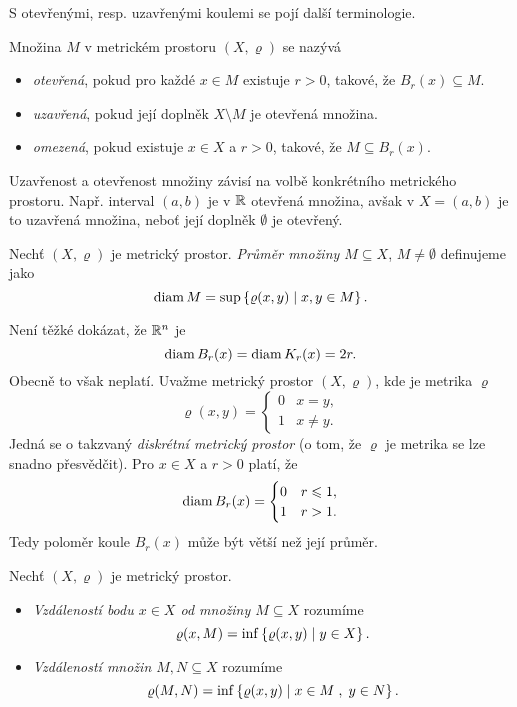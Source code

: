 S otevřenými, resp. uzavřenými koulemi se pojí další terminologie.
\begin{definition}\label{def:otevrena-uzavrena-omezena-mnozina}
     Množina $M$ v metrickém prostoru $(X,\varrho)$ se nazývá
     \begin{itemize}
        \item \emph{otevřená}, pokud pro každé $x\in M$ existuje $r>0$, takové, že $B_r(x)\subseteq M$.
        \item \emph{uzavřená}, pokud její doplněk $X\setminus M$ je otevřená množina.
        \item \emph{omezená}, pokud existuje $x\in X$ a $r>0$, takové, že $M\subseteq B_r(x)$.
     \end{itemize}
\end{definition}
Uzavřenost a otevřenost množiny závisí na volbě konkrétního metrického prostoru. Např. interval $(a,b)$ je v $\mathbb{R}$ otevřená množina, avšak v $X=(a,b)$ je to uzavřená množina, neboť její doplněk $\emptyset$ je otevřený.
\begin{definition}\label{def:prumer-mnoziny}
    Nechť $(X,\varrho)$ je metrický prostor. \emph{Průměr množiny $M\subseteq X$}, $M\neq\emptyset$ definujeme jako
    \[\operatorname{diam}{M}=\sup\left\{\varrho(x,y)\mid x,y\in M\right\}.\]
\end{definition}
Není těžké dokázat, že $\mathbb{R}^n$ je
\[\operatorname{diam}{B_r(x)}=\operatorname{diam}{K_r(x)}=2r.\]
Obecně to však neplatí. Uvažme metrický prostor $(X,\varrho)$, kde je metrika $\varrho$
\[\varrho(x,y)=\begin{cases}
    0 & x=y,\\
    1 & x\neq y.
\end{cases}\]
Jedná se o takzvaný \emph{diskrétní metrický prostor} (o tom, že $\varrho$ je metrika se lze snadno přesvědčit). Pro $x\in X$ a $r>0$ platí, že
\[\operatorname{diam}{B_r(x)}=\begin{cases}
    0 & r\leqslant 1,\\
    1 & r>1.
\end{cases}\]
Tedy poloměr koule $B_r(x)$ může být větší než její průměr.

\begin{definition}\label{def:vzdalenost-bodu-od-mnoziny-vzdalenost-mnozin}
    Nechť $(X,\varrho)$ je metrický prostor.
    \begin{itemize}
        \item {}\emph{Vzdáleností bodu $x\in X$ od množiny $M\subseteq X$} rozumíme
        \[\varrho(x,M)=\inf\left\{\varrho(x,y)\mid y\in X\right\}.\]
        \item {}\emph{Vzdáleností množin $M,N\subseteq X$} rozumíme
        \[\varrho(M,N)=\inf\left\{\varrho(x,y)\mid x\in M\;,\;y\in N\right\}.\]
    \end{itemize}
\end{definition}

